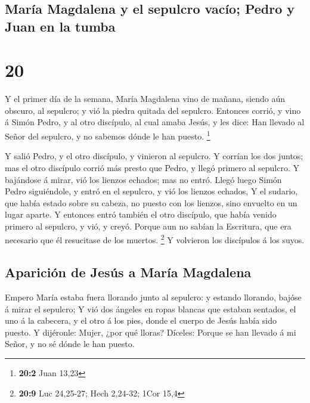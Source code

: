 \hypertarget{maruxeda-magdalena-y-el-sepulcro-vacuxedo-pedro-y-juan-en-la-tumba}{%
\subsection{María Magdalena y el sepulcro vacío; Pedro y Juan en la
tumba}\label{maruxeda-magdalena-y-el-sepulcro-vacuxedo-pedro-y-juan-en-la-tumba}}

\hypertarget{section-19}{%
\section{20}\label{section-19}}

 Y el primer día de la semana, María Magdalena vino de
mañana, siendo aún obscuro, al sepulcro; y vió la piedra quitada del
sepulcro.  Entonces corrió, y vino á Simón Pedro, y al otro
discípulo, al cual amaba Jesús, y les dice: Han llevado al Señor del
sepulcro, y no sabemos dónde le han puesto. \footnote{\textbf{20:2} Juan
  13,23}

 Y salió Pedro, y el otro discípulo, y vinieron al sepulcro.
 Y corrían los dos juntos; mas el otro discípulo corrió más
presto que Pedro, y llegó primero al sepulcro.  Y bajándose
á mirar, vió los lienzos echados; mas no entró.  Llegó luego
Simón Pedro siguiéndole, y entró en el sepulcro, y vió los lienzos
echados,  Y el sudario, que había estado sobre su cabeza, no
puesto con los lienzos, sino envuelto en un lugar aparte.  Y
entonces entró también el otro discípulo, que había venido primero al
sepulcro, y vió, y creyó.  Porque aun no sabían la
Escritura, que era necesario que él resucitase de los muertos.
\footnote{\textbf{20:9} Luc 24,25-27; Hech 2,24-32; 1Cor 15,4}
 Y volvieron los discípulos á los suyos.

\hypertarget{apariciuxf3n-de-jesuxfas-a-maruxeda-magdalena}{%
\subsection{Aparición de Jesús a María
Magdalena}\label{apariciuxf3n-de-jesuxfas-a-maruxeda-magdalena}}

 Empero María estaba fuera llorando junto al sepulcro: y
estando llorando, bajóse á mirar el sepulcro;  Y vió dos
ángeles en ropas blancas que estaban sentados, el uno á la cabecera, y
el otro á los pies, donde el cuerpo de Jesús había sido puesto.
 Y dijéronle: Mujer, ¿por qué lloras? Díceles: Porque se
han llevado á mi Señor, y no sé dónde le han puesto.

